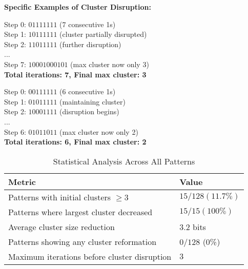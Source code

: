 \documentclass[10pt,letterpaper]{article}
\begin{document}
\textbf{Specific Examples of Cluster Disruption:}
\vspace{1em}

\begin{tcolorbox}[colframe=black!50!black,colback=white!10!white,title=Maximum cluster (7 ones) ${n=127= 01111111}$] 
Step 0: $01111111$ (7 consecutive 1s)\\
Step 1: $10111111$ (cluster partially disrupted)\\ 
Step 2: $11011111$ (further disruption)\\
... \\
Step 7: $10001000101$ (max cluster now only 3) \\
\textbf{Total iterations: 7, Final max cluster: 3}
\end{tcolorbox}
\vspace{1em}

\begin{tcolorbox}[colframe=black!50!black,colback=white!10!white,title=Large cluster (6 ones) ${n=63= 00111111}$] 
Step 0: $00111111$ (6 consecutive 1s)\\
Step 1: $01011111$ (maintaining cluster)\\
Step 2: $10001111$ (disruption begins)\\
...\\
Step 6: $01011011$ (max cluster now only 2)\\
\textbf{Total iterations: 6, Final max cluster: 2}
\end{tcolorbox}

\vspace{1em}

\begin{table}[h]
  \centering
  \begin{tabular}{|l|l|}
    \hline
    Metric & Value \\ \hline
    Patterns with initial clusters $\geq 3$        & $15/128 (11.7\%)$ \\ \hline
    Patterns where largest cluster decreased       & $15/15 (100\%)$ \\ \hline
    Average cluster size reduction                 & $3.2$ bits \\ \hline
    Patterns showing any cluster reformation       & $0/128$ (0\%) \\ \hline 
    Maximum iterations before cluster disruption   &  $3$ \\ \hline
  \end{tabular}
  \caption{Statistical Analysis Across All Patterns}
  \label{tab:}
\end{table}
\end{document}
